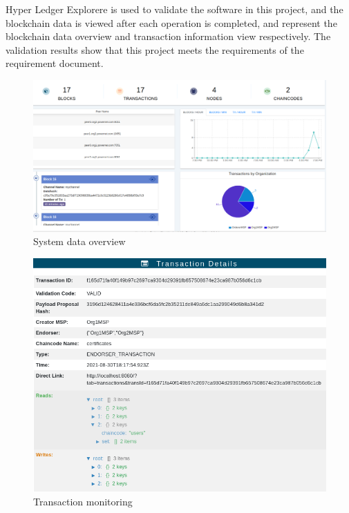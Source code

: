 Hyper Ledger Explorere is used to validate the software in this project, and the blockchain data is viewed after each operation is completed,  and  represent the blockchain data overview and transaction information view respectively. The validation results show that this project meets the requirements of the requirement document.
\begin{figure}[!htb]
    \centering
    \includegraphics[width= \textwidth]{img/overview.png}
    \caption{System data overview}
    \label{fig:dataoverview}
\end{figure}
\begin{figure}[!htb]
    \centering
    \includegraphics[width=.9 \textwidth]{img/transaction.png}
    \caption{Transaction monitoring}
    \label{fig:transaction}
\end{figure}

